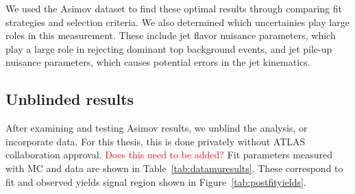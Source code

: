 We used the Asimov dataset to find these optimal results through comparing fit strategies and selection criteria. We also determined which uncertainies play large roles in this measurement. These include jet flavor nuisance parameters, which play a large role in rejecting dominant top background events, and jet pile-up nuisance parameters, which causes potential errors in the jet kinematics.

\subsection{Unblinded results}

After examining and testing Asimov results, we unblind the analysis, or incorporate data. For this thesis, this is done privately without ATLAS collaboration approval. \textcolor{red}{Does this need to be added?} Fit parameters measured with MC and data are shown in Table~\ref{tab:datamuresults}. These correspond to fit and observed yields signal region shown in Figure~\ref{tab:postfityields}.

\begin{table}[!h]
  \begin{center}
    \caption{Fit results for all floating parameters in stat-only and full systematic fits.}
    \label{tab:datamuresults}
  \end{center}
\end{table}

